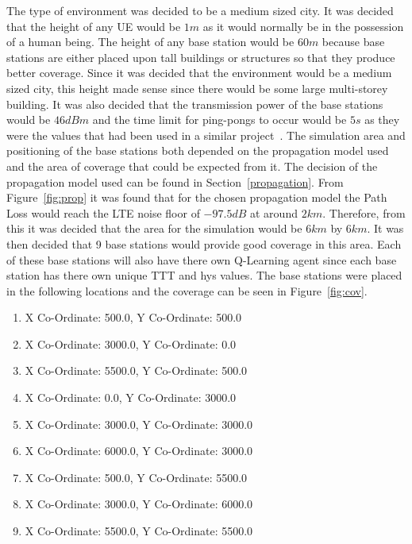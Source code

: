 The type of environment was decided to be a medium sized city. It was decided that the height of any UE would be $1 m$ as it would normally be in the possession of a human being. The height of any base station would be $60 m$ because base stations are either placed upon tall buildings or structures so that they produce better coverage. Since it was decided that the environment would be a medium sized city, this height made sense since there would be some large multi-storey building. It was also decided that the transmission power of the base stations would be $46 dBm$ and the time limit for ping-pongs to occur would be $5 s$ as they were the values that had been used in a similar project~\cite{jansen2010handover}. The simulation area and positioning of the base stations both depended on the propagation model used and the area of coverage that could be expected from it. The decision of the propagation model used can be found in Section~\ref{propagation}. From Figure~\ref{fig:prop} it was found that for the chosen propagation model the Path Loss would reach the LTE noise floor of $-97.5 dB$ at around $2 km$. Therefore, from this it was decided that the area for the simulation would be $6 km$ by $6 km$. It was then decided that 9 base stations would provide good coverage in this area. Each of these base stations will also have there own Q-Learning agent since each base station has there own unique TTT and hys values. The base stations were placed in the following locations and the coverage can be seen in Figure~\ref{fig:cov}.
\begin{enumerate}
\item X Co-Ordinate: 500.0, Y Co-Ordinate: 500.0
\item X Co-Ordinate: 3000.0, Y Co-Ordinate: 0.0
\item X Co-Ordinate: 5500.0, Y Co-Ordinate: 500.0
\item X Co-Ordinate: 0.0, Y Co-Ordinate: 3000.0
\item X Co-Ordinate: 3000.0, Y Co-Ordinate: 3000.0
\item X Co-Ordinate: 6000.0, Y Co-Ordinate: 3000.0
\item X Co-Ordinate: 500.0, Y Co-Ordinate: 5500.0
\item X Co-Ordinate: 3000.0, Y Co-Ordinate: 6000.0
\item X Co-Ordinate: 5500.0, Y Co-Ordinate: 5500.0
\end{enumerate}

